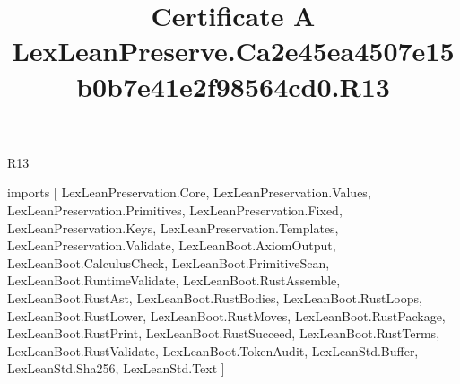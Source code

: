 \begin{lexlean}{R13}
\title{Certificate A LexLeanPreserve.Ca2e45ea4507e15b0b7e41e2f98564cd0.R13}
\begin{coremodule}
imports [
  LexLeanPreservation.Core,
  LexLeanPreservation.Values,
  LexLeanPreservation.Primitives,
  LexLeanPreservation.Fixed,
  LexLeanPreservation.Keys,
  LexLeanPreservation.Templates,
  LexLeanPreservation.Validate,
  LexLeanBoot.AxiomOutput,
  LexLeanBoot.CalculusCheck,
  LexLeanBoot.PrimitiveScan,
  LexLeanBoot.RuntimeValidate,
  LexLeanBoot.RustAssemble,
  LexLeanBoot.RustAst,
  LexLeanBoot.RustBodies,
  LexLeanBoot.RustLoops,
  LexLeanBoot.RustLower,
  LexLeanBoot.RustMoves,
  LexLeanBoot.RustPackage,
  LexLeanBoot.RustPrint,
  LexLeanBoot.RustSucceed,
  LexLeanBoot.RustTerms,
  LexLeanBoot.RustValidate,
  LexLeanBoot.TokenAudit,
  LexLeanStd.Buffer,
  LexLeanStd.Sha256,
  LexLeanStd.Text
]


\end{coremodule}
\end{lexlean}
